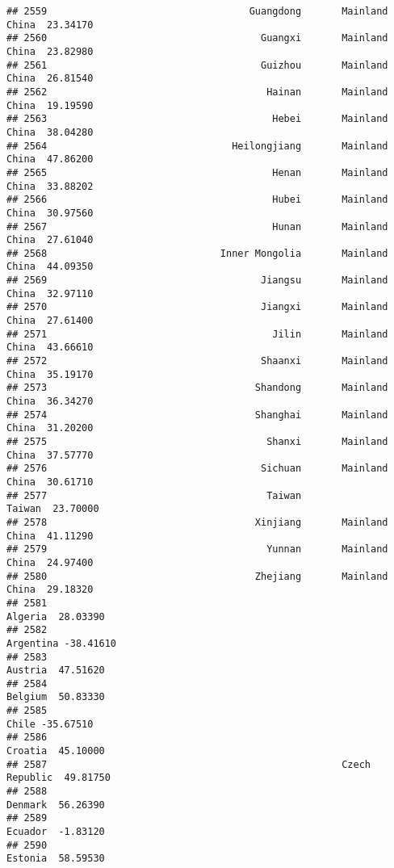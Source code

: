 \documentclass[
]{article}
\begin{document}
\begin{verbatim}
## 2559                                   Guangdong       Mainland China  23.34170
## 2560                                     Guangxi       Mainland China  23.82980
## 2561                                     Guizhou       Mainland China  26.81540
## 2562                                      Hainan       Mainland China  19.19590
## 2563                                       Hebei       Mainland China  38.04280
## 2564                                Heilongjiang       Mainland China  47.86200
## 2565                                       Henan       Mainland China  33.88202
## 2566                                       Hubei       Mainland China  30.97560
## 2567                                       Hunan       Mainland China  27.61040
## 2568                              Inner Mongolia       Mainland China  44.09350
## 2569                                     Jiangsu       Mainland China  32.97110
## 2570                                     Jiangxi       Mainland China  27.61400
## 2571                                       Jilin       Mainland China  43.66610
## 2572                                     Shaanxi       Mainland China  35.19170
## 2573                                    Shandong       Mainland China  36.34270
## 2574                                    Shanghai       Mainland China  31.20200
## 2575                                      Shanxi       Mainland China  37.57770
## 2576                                     Sichuan       Mainland China  30.61710
## 2577                                      Taiwan               Taiwan  23.70000
## 2578                                    Xinjiang       Mainland China  41.11290
## 2579                                      Yunnan       Mainland China  24.97400
## 2580                                    Zhejiang       Mainland China  29.18320
## 2581                                                          Algeria  28.03390
## 2582                                                        Argentina -38.41610
## 2583                                                          Austria  47.51620
## 2584                                                          Belgium  50.83330
## 2585                                                            Chile -35.67510
## 2586                                                          Croatia  45.10000
## 2587                                                   Czech Republic  49.81750
## 2588                                                          Denmark  56.26390
## 2589                                                          Ecuador  -1.83120
## 2590                                                          Estonia  58.59530

\end{verbatim}
\end{document}
